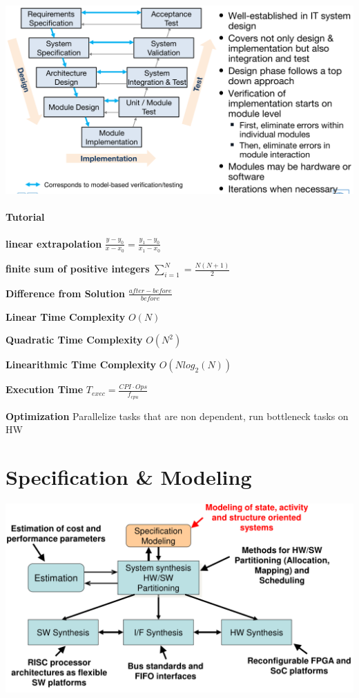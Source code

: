 \documentclass[english]{latex4ei/latex4ei_sheet}
\begin{document}
\begin{center}
  \includegraphics[width=0.8\linewidth]{assets/VModel.png}
\end{center}

\paragraph{Tutorial}

\textbf{linear extrapolation} $\frac{y - y_0}{x - x_0} = \frac{y_1 - y_0}{x_1 - x_0}$

\textbf{finite sum of positive integers} $\sum_{i=1}^{N} = \frac{N(N+1)}{2}$

\textbf{Difference from Solution} $\frac{after - before}{before}$
 
\textbf{Linear Time Complexity} $ O(N)$

\textbf{Quadratic Time Complexity} $ O(N^2)$

\textbf{Linearithmic Time Complexity} $ O(N log_2(N))$

\textbf{Execution Time} $T_{exec} = \frac{CPI \cdot Ops}{f_{cpu}}$
 
\textbf{Optimization} Parallelize tasks that are non dependent, run bottleneck tasks on HW


\section{Specification \& Modeling}

\begin{center}
  \includegraphics[width=0.8\linewidth]{assets/DesignFlowSystemLevel.png}
\end{center}
\end{document}
